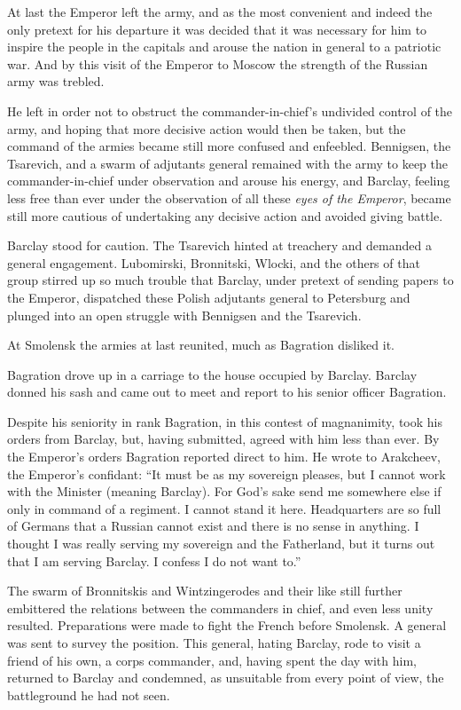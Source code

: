 At last the Emperor left the army, and as the most convenient and
indeed the only pretext for his departure it was decided that it
was necessary for him to inspire the people in the capitals and
arouse the nation in general to a patriotic war. And by this
visit of the Emperor to Moscow the strength of the Russian army
was trebled.

He left in order not to obstruct the commander-in-chief's
undivided control of the army, and hoping that more decisive
action would then be taken, but the command of the armies became
still more confused and enfeebled. Bennigsen, the Tsarevich, and
a swarm of adjutants general remained with the army to keep the
commander-in-chief under observation and arouse his energy, and
Barclay, feeling less free than ever under the observation of all
these \emph{eyes of the Emperor}, became still more cautious of
undertaking any decisive action and avoided giving battle.

Barclay stood for caution. The Tsarevich hinted at treachery and
demanded a general engagement. Lubomirski, Bronnitski, Wlocki,
and the others of that group stirred up so much trouble that
Barclay, under pretext of sending papers to the Emperor,
dispatched these Polish adjutants general to Petersburg and
plunged into an open struggle with Bennigsen and the Tsarevich.

At Smolensk the armies at last reunited, much as Bagration
disliked it.

Bagration drove up in a carriage to the house occupied by
Barclay.  Barclay donned his sash and came out to meet and report
to his senior officer Bagration.

Despite his seniority in rank Bagration, in this contest of
magnanimity, took his orders from Barclay, but, having submitted,
agreed with him less than ever. By the Emperor's orders Bagration
reported direct to him. He wrote to Arakcheev, the Emperor's
confidant: ``It must be as my sovereign pleases, but I cannot
work with the Minister (meaning Barclay). For God's sake send me
somewhere else if only in command of a regiment. I cannot stand
it here. Headquarters are so full of Germans that a Russian
cannot exist and there is no sense in anything. I thought I was
really serving my sovereign and the Fatherland, but it turns out
that I am serving Barclay. I confess I do not want to.''

The swarm of Bronnitskis and Wintzingerodes and their like still
further embittered the relations between the commanders in chief,
and even less unity resulted. Preparations were made to fight the
French before Smolensk. A general was sent to survey the
position. This general, hating Barclay, rode to visit a friend of
his own, a corps commander, and, having spent the day with him,
returned to Barclay and condemned, as unsuitable from every point
of view, the battleground he had not seen.

